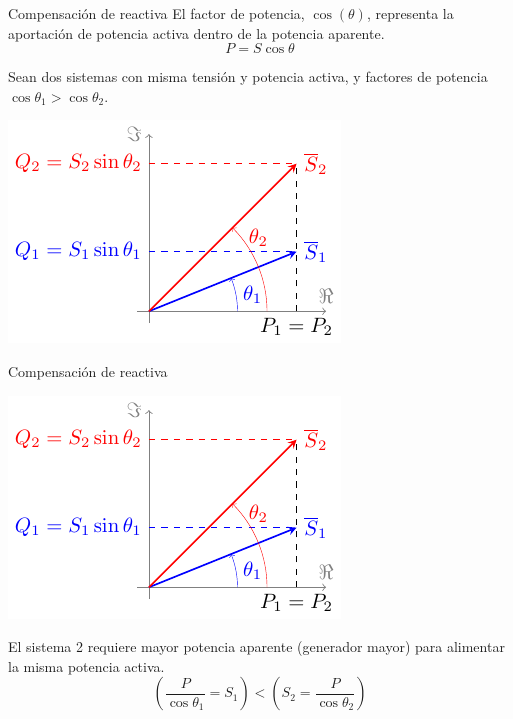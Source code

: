 \documentclass[xcolor={usenames,svgnames,dvipsnames}]{beamer}
\begin{document}
\begin{frame}[label={sec:org05dce7e}]{Compensación de reactiva}
El factor de potencia, \(\cos(\theta)\), representa la aportación de potencia activa dentro de la potencia aparente.
\[
P = S \cos \theta
\]

Sean dos sistemas con \alert{misma tensión y potencia activa}, y factores de potencia \(\cos \theta_1 > \cos \theta_2\).

\begin{center}
\includegraphics[height=0.5\textheight]{../figs/compensacionReactiva.pdf}
\end{center}
\end{frame}


\begin{frame}[label={sec:org4fb8b2e}]{Compensación de reactiva}
\begin{center}
\includegraphics[height=0.5\textheight]{../figs/compensacionReactiva.pdf}
\end{center}


El sistema 2 requiere \alert{mayor potencia aparente} (generador mayor) para alimentar la misma potencia activa.
\[
  \left(\frac{P}{\cos \theta_1} = S_1 \right) < \left( S_2 = \frac{P}{\cos \theta_2}\right) 
\]
\end{frame}
\end{document}
